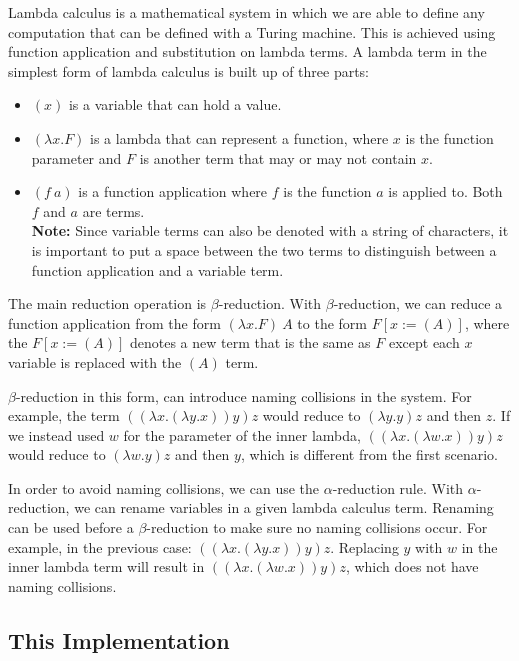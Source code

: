 \documentclass[12pt]{article}
\begin{document}
Lambda calculus is a mathematical system in which we are able to define any
computation that can be defined with a Turing machine. This is achieved using
function application and substitution on lambda terms. A lambda term in the
simplest form of lambda calculus is built up of three parts:
\begin{itemize}
    \item $(x)$ is a variable that can hold a value.
    \item $(\lambda x. F)$ is a lambda that can represent a function, where $x$
        is the function parameter and $F$ is another term that may or 
        may not contain $x$.
    \item $(f\:a)$ is a function application where $f$ is the function $a$ is
        applied to. Both $f$ and $a$ are terms. \\ \textbf{Note:} Since variable
        terms can also be denoted with a string of characters, it is important
        to put a space between the two terms to distinguish between a function
        application and a variable term.
\end{itemize}
The main reduction operation is $\beta$-reduction. With $\beta$-reduction, we
can reduce a function application from the form $(\lambda x. F)\:A$ to the
form $F[x := (A)]$, where the $F[x := (A)]$ denotes a new term that is the same
as $F$ except each $x$ variable is replaced with the $(A)$ term.

$\beta$-reduction in this form, can introduce naming collisions in the system.
For example, the term $((\lambda x. (\lambda y. x)) y) z$ would reduce to
$(\lambda y. y) z$ and then $z$. If we instead used $w$ for the parameter of the
inner lambda, $((\lambda x. (\lambda w. x)) y) z$ would reduce to $(\lambda w.
y) z$ and then $y$, which is different from the first scenario.

In order to avoid naming collisions, we can use the $\alpha$-reduction rule.
With $\alpha$-reduction, we can rename variables in a given lambda calculus
term. Renaming can be used before a $\beta$-reduction to make sure no naming
collisions occur. For example, in the previous case: $((\lambda x. (\lambda y.
x)) y) z$. Replacing $y$ with $w$ in the inner lambda term will result in
$((\lambda x. (\lambda w. x)) y) z$, which does not have naming collisions.


\subsection{This Implementation}
\end{document}
